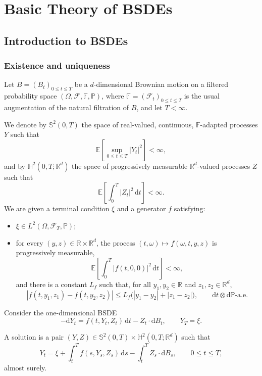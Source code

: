 \chapter{Basic Theory of BSDEs}

\section{Introduction to BSDEs}

\subsection{Existence and uniqueness}

Let $B=(B_t)_{0\le t\le T}$ be a $d$-dimensional Brownian motion on a
filtered probability space $(\Omega,\mathcal F,\mathbb F,\mathbb P)$,
where $\mathbb F=(\mathcal F_t)_{0\le t\le T}$ is the usual augmentation
of the natural filtration of $B$, and let $T<\infty$.

We denote by $\mathbb S^2(0,T)$ the space of real-valued, continuous,
$\mathbb F$-adapted processes $Y$ such that
\[
  \mathbb E\!\left[\sup_{0\le t\le T}|Y_t|^2\right]<\infty,
\]
and by $\mathbb H^2(0,T;\mathbb R^d)$ the space of progressively
measurable $\mathbb R^d$-valued processes $Z$ such that
\[
  \mathbb E\!\left[\int_0^T |Z_t|^2\,\mathrm dt\right]<\infty.
\]
We are given a terminal condition $\xi$ and a generator $f$ satisfying:
\begin{itemize}
  \item[(A)] $\xi\in L^2(\Omega,\mathcal F_T,\mathbb P)$;
  \item[(B)] for every $(y,z)\in\mathbb R\times\mathbb R^d$, the process
  $(t,\omega)\mapsto f(\omega,t,y,z)$ is progressively measurable,
  \[
    \mathbb E\!\left[\int_0^T |f(t,0,0)|^2\,\mathrm dt\right]<\infty,
  \]
  and there is a constant $L_f$ such that, for all $y_1,y_2\in\mathbb R$
  and $z_1,z_2\in\mathbb R^d$,
  \[
    |f(t,y_1,z_1)-f(t,y_2,z_2)|
    \le L_f\bigl(|y_1-y_2|+|z_1-z_2|\bigr),
    \qquad \mathrm dt\otimes\mathrm d\mathbb P\text{-a.e.}
  \]
\end{itemize}

Consider the one-dimensional BSDE
\[
  -\mathrm dY_t=f(t,Y_t,Z_t)\,\mathrm dt-Z_t\cdot\mathrm dB_t,
  \qquad Y_T=\xi.
\]

\begin{de}
A solution is a pair
$(Y,Z)\in\mathbb S^2(0,T)\times\mathbb H^2(0,T;\mathbb R^d)$ such that
\[
  Y_t=\xi+\int_t^T f(s,Y_s,Z_s)\,\mathrm ds
      -\int_t^T Z_s\cdot\mathrm dB_s,
  \qquad 0\le t\le T,
\]
almost surely.
\end{de}

